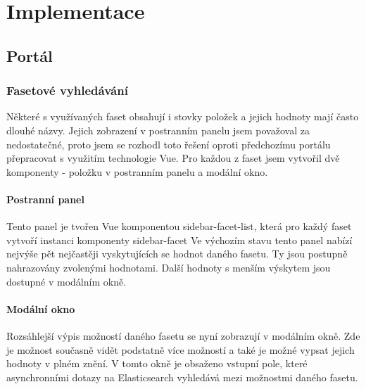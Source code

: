 \chapter{Implementace}

\section{Portál}

\subsection{Fasetové vyhledávání}
Některé s využívaných faset obsahují i stovky položek a jejich hodnoty mají často dlouhé názvy. Jejich zobrazení v postranním panelu jsem považoval za nedostatečné, proto jsem se rozhodl toto řešení oproti předchozímu portálu přepracovat s využitím technologie Vue. Pro každou z faset jsem vytvořil dvě komponenty - položku v postranním panelu a modální okno.

\subsubsection{Postranní panel}
Tento panel je tvořen Vue komponentou sidebar-facet-list, která pro každý faset vytvoří instanci komponenty sidebar-facet
Ve výchozím stavu tento panel nabízí nejvýše pět nejčastěji vyskytujících se hodnot daného fasetu. Ty jsou postupně nahrazovány zvolenými hodnotami. Další hodnoty s menším výskytem jsou dostupné v modálním okně.

\subsubsection{Modální okno}
Rozsáhlejší výpis možností daného fasetu se nyní zobrazují v modálním okně. Zde je možnost současně vidět podstatně více možností a také je možné vypsat jejich hodnoty v plném znění. V tomto okně je obsaženo vstupní pole, které asynchronními dotazy na Elasticsearch vyhledává mezi možnostmi daného fasetu.